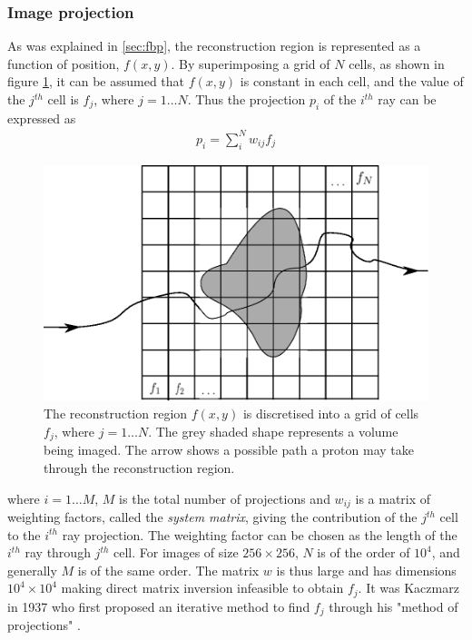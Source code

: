\documentclass[11pt,a4paper]{article}
\begin{document}
\subsubsection{Image projection}
As was explained in \ref{sec:fbp}, the reconstruction region is represented as a function of position, $f(x,y)$. By superimposing a grid of $N$ cells, as shown in figure \ref{fig:grid}, it can be assumed that $f(x,y)$ is constant in each cell, and the value of the $j^{th}$ cell is $f_j$, where $j = 1 \ldots N$. Thus the projection $p_{i}$ of the $i^{th}$ ray can be expressed as
\begin{eqnarray}
p_{i} = \sum_{i}^N w_{ij} f_j
\label{proj}
\end{eqnarray}
\begin{figure}[h]
\centering
\includegraphics[scale=0.8]{img/grid.eps}
\caption{The reconstruction region $f(x,y)$ is discretised into a grid of cells $f_j$, where $j = 1 \ldots N$. The grey shaded shape represents a volume being imaged. The arrow shows a possible path a proton may take through the reconstruction region.}
\label{fig:grid}
\end{figure}
where $i = 1 \ldots M$, $M$ is the total number of projections and $w_{ij}$ is a matrix of weighting factors, called the \textit{system matrix}, giving the contribution of the $j^{th}$ cell to the $i^{th}$ ray projection. The weighting factor can be chosen as the length of the $i^{th}$ ray through $j^{th}$ cell. For images of size $256 \times 256$, $N$ is of the order of $10^{4}$, and generally $M$ is of the same order. The matrix $w$ is thus large and has dimensions $10^{4} \times 10^{4}$ making direct matrix inversion infeasible to obtain $f_{j}$. It was Kaczmarz in 1937 who first proposed an iterative method to find $f_{j}$ through his "method of projections" \cite{kaczmarz1937angenaherte}.
\end{document}
